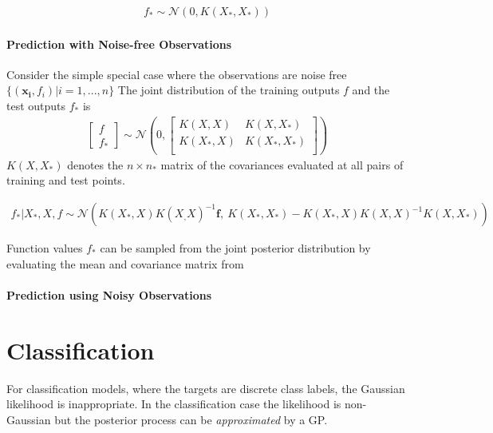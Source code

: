 \documentclass[a4paper]{article}
\begin{document}
\begin{align}
  f_* \sim \mathcal{N} (0, K(X_*, X_*))
\end{align}

\paragraph{Prediction with Noise-free Observations}
Consider the simple special case where the observations are noise free $\{(\mathbf{x_i},f_i)| i=1,...,n\}$
The joint distribution of the training outputs $f$ and the test outputs $f_*$ is
\begin{align}
  \begin{bmatrix}
    f\\
    f_*
  \end{bmatrix}
  \sim \mathcal{N}(0,
  \begin{bmatrix}
    K(X,X) & K(X,X_*)\\
    K(X_*,X) & K(X_*,X_*)\\
  \end{bmatrix})
\end{align}
$K(X, X_*)$ denotes the $n \times n_*$ matrix of the covariances evaluated at all pairs of training and test points.

\begin{align}
\label{eq:joint_posterior}
  f_*|X_*,X,f \sim \mathcal{N} (K(X_*,X) K(X_,X)^{-1} \mathbf{f},\: K(X_*,X_*) - K(X_*,X) K(X,X)^{-1} K(X,X_*) )
\end{align}

Function values $f_*$ can be sampled from the joint posterior distribution by evaluating the mean and covariance matrix from \cite{eq:joint_posterior} 

\paragraph{Prediction using Noisy Observations}



\section{Classification}

For classification models, where the targets are discrete class labels, the Gaussian likelihood is inappropriate.
In the classification case the likelihood is non-Gaussian but the posterior process can be \emph{approximated} by a GP.
\end{document}
